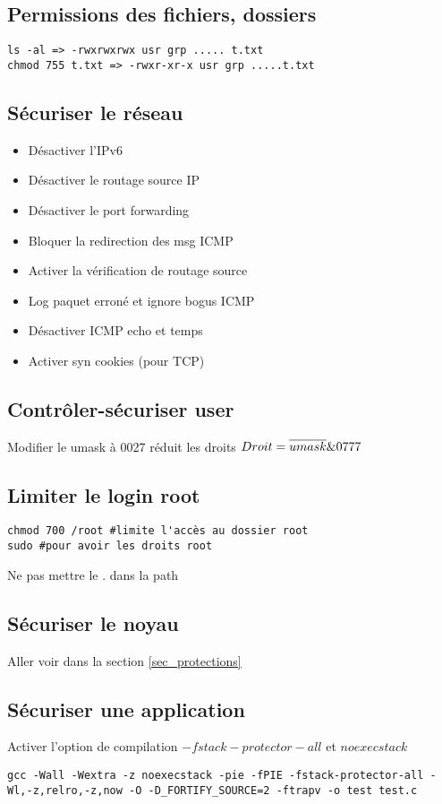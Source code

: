 \documentclass[resume]{subfiles}
\begin{document}
\subsection{Permissions des fichiers, dossiers}
\begin{lstlisting}[style=console]
ls -al => -rwxrwxrwx usr grp ..... t.txt
chmod 755 t.txt => -rwxr-xr-x usr grp .....t.txt
\end{lstlisting}

\subsection{Sécuriser le réseau}
\begin{itemize}
\item Désactiver l'IPv6
\item Désactiver le routage source IP
\item Désactiver le port forwarding
\item Bloquer la redirection des msg ICMP
\item Activer la vérification de routage source
\item Log paquet erroné et ignore bogus ICMP
\item Désactiver ICMP echo et temps
\item Activer syn cookies (pour TCP)
\end{itemize}

\subsection{Contrôler-sécuriser user}
Modifier le umask à 0027 réduit les droits
$Droit = \overline{umask}\space \& 0777$

\subsection{Limiter le login root}
\begin{lstlisting}[style=console]
chmod 700 /root #limite l'accès au dossier root
sudo #pour avoir les droits root
\end{lstlisting}
Ne pas mettre le . dans la path

\subsection{Sécuriser le noyau}
Aller voir dans la section \ref{sec_protections}

\subsection{Sécuriser une application}
Activer l'option de compilation $-fstack-protector-all$ et $noexecstack$
\begin{lstlisting}[style=console]
gcc -Wall -Wextra -z noexecstack -pie -fPIE -fstack-protector-all -Wl,-z,relro,-z,now -O -D_FORTIFY_SOURCE=2 -ftrapv -o test test.c
\end{lstlisting}
\end{document}
